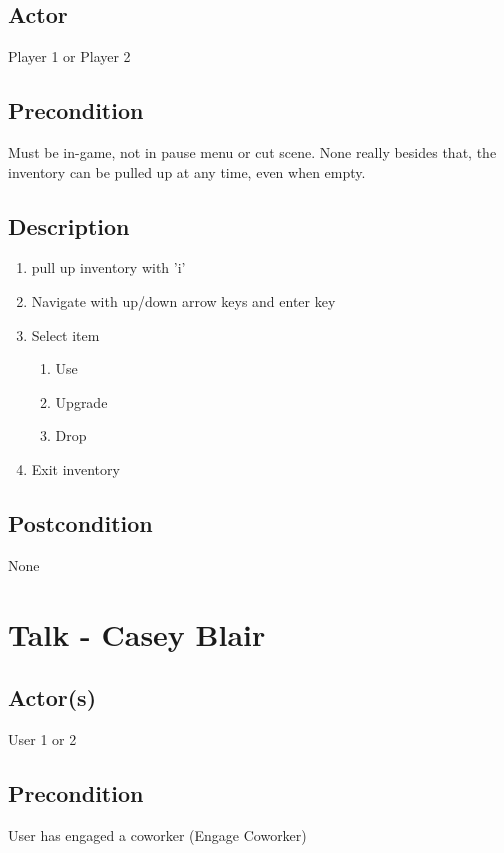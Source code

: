 \documentclass[11pt]{article}
\begin{document}
		\subsection{Actor}
			
			Player 1 or Player 2

		\subsection{Precondition}
		
			Must be in-game, not in pause menu or cut scene.
			None really besides that, the inventory can be pulled up at any time,
			even when empty.
 
		\subsection{Description}
			\begin{enumerate}
			\item pull up inventory with 'i'
			\item Navigate with up/down arrow keys and enter key
			\item Select item
			
				\begin{enumerate}
					\item Use
					\item Upgrade
					\item Drop
				\end{enumerate}
			\item Exit inventory
			\end{enumerate}

		\subsection{Postcondition}
		
			None


\section{Talk - Casey Blair}
	

		\subsection{Actor(s)}
			User 1 or 2
			

		\subsection{Precondition}
				User has engaged a coworker (Engage Coworker)			
	
\end{document}
